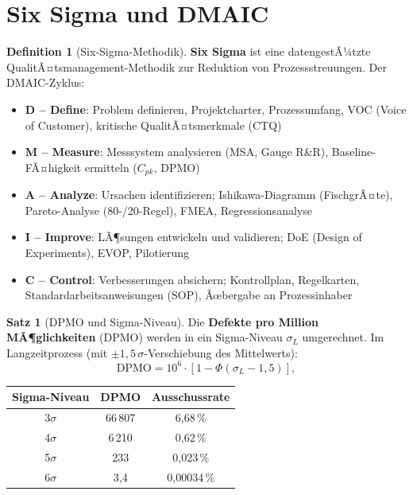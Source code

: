 ﻿\documentclass[a4paper,12pt]{report}
\theoremstyle{definition}
\newtheorem{definition}{Definition}
\newtheorem{satz}{Satz}
\begin{document}
\section{Six Sigma und DMAIC}

\begin{definition}[Six-Sigma-Methodik]
\textbf{Six Sigma} ist eine datengestÃ¼tzte QualitÃ¤tsmanagement-Methodik
zur Reduktion von Prozessstreuungen. Der DMAIC-Zyklus:
\begin{itemize}
    \item[-] \textbf{D -- Define}: Problem definieren, Projektcharter, Prozessumfang,
          VOC (Voice of Customer), kritische QualitÃ¤tsmerkmale (CTQ)
    \item[-] \textbf{M -- Measure}: Messsystem analysieren (MSA, Gauge R\&R),
          Baseline-FÃ¤higkeit ermitteln ($C_{pk}$, DPMO)
    \item[-] \textbf{A -- Analyze}: Ursachen identifizieren; Ishikawa-Diagramm
          (FischgrÃ¤te), Pareto-Analyse (80-/20-Regel), FMEA, Regressionsanalyse
    \item[-] \textbf{I -- Improve}: LÃ¶sungen entwickeln und validieren; DoE
          (Design of Experiments), EVOP, Pilotierung
    \item[-] \textbf{C -- Control}: Verbesserungen absichern; Kontrollplan,
          Regelkarten, Standardarbeitsanweisungen (SOP), Ãœbergabe an Prozessinhaber
\end{itemize}
\end{definition}

\begin{satz}[DPMO und Sigma-Niveau]
Die \textbf{Defekte pro Million MÃ¶glichkeiten} (DPMO) werden in ein
Sigma-Niveau $\sigma_L$ umgerechnet. Im Langzeitprozess
(mit $\pm 1{,}5\,\sigma$-Verschiebung des Mittelwerts):
\[
  \mathrm{DPMO} = 10^6 \cdot \left[1 - \Phi\left(\sigma_L - 1{,}5\right)\right],
\]
\begin{center}
\begin{tabular}{ccc}
\toprule
Sigma-Niveau & DPMO & Ausschussrate \\
\midrule
3$\sigma$ & 66\,807 & 6{,}68\,\% \\
4$\sigma$ & 6\,210 & 0{,}62\,\% \\
5$\sigma$ & 233 & 0{,}023\,\% \\
6$\sigma$ & 3{,}4 & 0{,}00034\,\% \\
\bottomrule
\end{tabular}
\end{center}
\end{satz}
\end{document}
